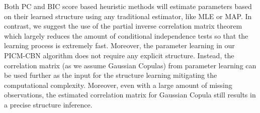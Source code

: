 %
Both PC and BIC score based heuristic 
methods will estimate parameters based on their learned structure using any traditional estimator, like MLE or
MAP.
%
In contrast, we suggest the use of the partial inverse correlation matrix theorem
which largely reduces the amount of conditional independence tests so that the learning
process is extremely fast. %
Moreover, the parameter learning in our PICM-CBN algorithm does not require any explicit structure. %
Instead, the correlation matrix (as we assume Gaussian Copulas) from parameter learning can be  
used further as the input for the structure learning mitigating the computational complexity.
%
Moreover, even with a large amount of missing observations, the estimated correlation 
matrix for Gaussian Copula still results in a precise structure inference.
% 

